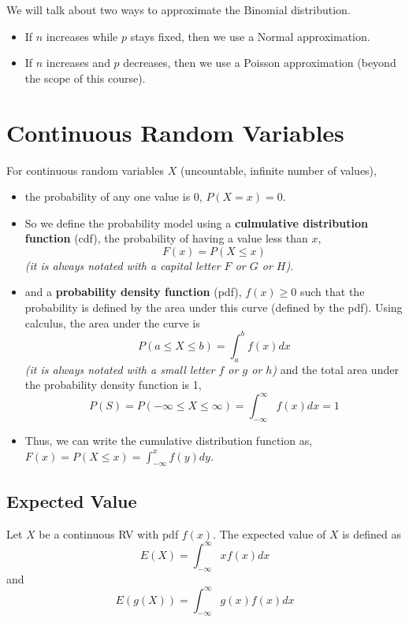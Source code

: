\documentclass[]{book}
\providecommand{\tightlist}{%
  \setlength{\itemsep}{0pt}\setlength{\parskip}{0pt}}
\begin{document}
We will talk about two ways to approximate the Binomial distribution.

\begin{itemize}
\tightlist
\item
  If \(n\) increases while \(p\) stays fixed, then we use a Normal approximation.
\item
  If \(n\) increases and \(p\) decreases, then we use a Poisson approximation (beyond the scope of this course).
\end{itemize}

\hypertarget{continuous-random-variables}{%
\section{Continuous Random Variables}\label{continuous-random-variables}}

For continuous random variables \(X\) (uncountable, infinite number of values),

\begin{itemize}
\item
  the probability of any one value is 0, \(P(X = x) = 0\).
\item
  So we define the probability model using a \textbf{culmulative distribution function} (cdf), the probability of having a value less than \(x\),
  \[F(x) = P(X\leq x)\]
  \emph{(it is always notated with a capital letter \(F\) or \(G\) or \(H\))}.
\item
  and a \textbf{probability density function} (pdf), \(f(x)\geq 0\) such that the probability is defined by the area under this curve (defined by the pdf). Using calculus, the area under the curve is
  \[P(a\leq X \leq b) = \int^b_a f(x)dx\]
  \emph{(it is always notated with a small letter \(f\) or \(g\) or \(h\))} and the total area under the probability density function is 1,
  \[P(S) = P(-\infty\leq X\leq \infty) = \int^\infty_{-\infty}f(x)dx = 1\]
\item
  Thus, we can write the cumulative distribution function as, \(F(x) = P(X \leq x) = \int^x_{-\infty} f(y)dy\).
\end{itemize}

\hypertarget{expected-value-1}{%
\subsection{Expected Value}\label{expected-value-1}}

Let \(X\) be a continuous RV with pdf \(f(x)\). The expected value of \(X\) is defined as
\[E(X)= \int^\infty_{-\infty} xf(x)dx \]
and
\[E(g(X))= \int^\infty_{-\infty} g(x)f(x)dx\]
\end{document}
